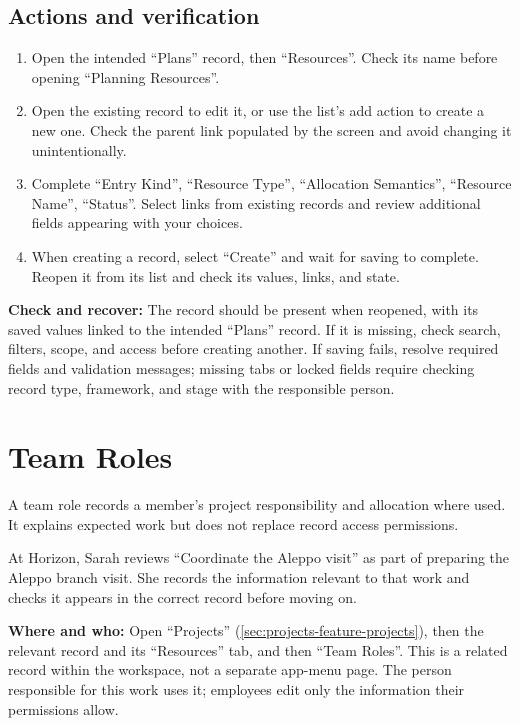 \subsection{Actions and verification}
\begin{enumerate}
\item Open the intended “Plans” record, then “Resources”. Check its name before opening “Planning Resources”.
\item Open the existing record to edit it, or use the list's add action to create a new one. Check the parent link populated by the screen and avoid changing it unintentionally.
\item Complete “Entry Kind”, “Resource Type”, “Allocation Semantics”, “Resource Name”, “Status”. Select links from existing records and review additional fields appearing with your choices.
\item When creating a record, select “Create” and wait for saving to complete. Reopen it from its list and check its values, links, and state.
\end{enumerate}

\textbf{Check and recover:} The record should be present when reopened, with its saved values linked to the intended “Plans” record. If it is missing, check search, filters, scope, and access before creating another. If saving fails, resolve required fields and validation messages; missing tabs or locked fields require checking record type, framework, and stage with the responsible person.

\clearpage
\section{Team Roles}
\label{sec:projects-feature-team-roles}

A team role records a member's project responsibility and allocation where used. It explains expected work but does not replace record access permissions.

\begin{rcnote}
At Horizon, Sarah reviews “Coordinate the Aleppo visit” as part of preparing the Aleppo branch visit. She records the information relevant to that work and checks it appears in the correct record before moving on.
\end{rcnote}

\textbf{Where and who:} Open “Projects” (\ref{sec:projects-feature-projects}), then the relevant record and its “Resources” tab, and then “Team Roles”. This is a related record within the workspace, not a separate app-menu page. The person responsible for this work uses it; employees edit only the information their permissions allow.


